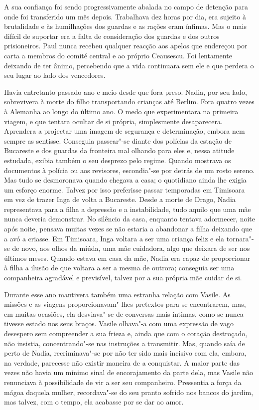 A sua confiança foi sendo progressivamente abalada no campo de detenção
para onde foi transferido um mês depois. Trabalhava dez horas por dia,
era sujeito à brutalidade e às humilhações dos guardas e as rações
eram ínfimas. Mas o mais difícil de suportar era a falta de consideração dos guardas e dos outros prisioneiros. Paul nunca recebeu
qualquer reacção aos apelos que endereçou por carta a membros do comité
central e ao próprio Ceausescu. Foi lentamente deixando de ter ânimo,
percebendo que a vida continuara sem ele e que perdera o seu lugar ao
lado dos vencedores.

Havia entretanto passado ano e meio desde que fora preso. Nadia, por seu
lado, sobrevivera à morte do filho transportando crianças até Berlim.
Fora quatro vezes à Alemanha ao longo do último ano. O medo que
experimentara na primeira viagem, e que tentara ocultar de si própria,
simplesmente desaparecera. Aprendera a projectar uma imagem de segurança
e determinação, embora nem sempre as sentisse. Conseguia passear"-se
diante dos polícias da
estação de Bucareste e dos guardas da fronteira mal olhando para eles e,
nessa atitude estudada, exibia também o seu desprezo pelo regime. Quando
mostrava os documentos à polícia ou aos revisores, escondia"-se por
detrás de um rosto sereno. Mas tudo se desmoronava quando chegava a
casa; o quotidiano ainda lhe exigia um esforço enorme. Talvez por isso
preferisse passar temporadas em Timisoara em vez de trazer Inga de volta
a Bucareste. Desde a morte de Drago, Nadia representava para a filha a
depressão e a instabilidade, tudo aquilo que uma mãe nunca deveria
demonstrar. No silêncio da casa, enquanto tentava adormecer, noite após
noite, pensava muitas vezes se não estaria a abandonar a filha deixando
que a avó a criasse. Em Timisoara, Inga voltara a ser uma criança feliz
e ela tornara"-se de novo, aos olhos da miúda, uma mãe cuidadora, algo
que deixara de ser nos últimos meses. Quando estava em casa da mãe,
Nadia era capaz de proporcionar à filha a ilusão de que voltara a ser a
mesma de outrora; conseguia ser uma companheira agradável e
previsível, talvez por a sua própria mãe cuidar de si.

Durante esse ano mantivera também uma estranha
relação com Vasile. As missões e as viagens proporcionavam"-lhes pretextos para se encontrarem, mas, em muitas ocasiões, ela
desviava"-se de conversas mais íntimas, como se nunca tivesse estado nos
seus braços. Vasile olhava"-a com uma expressão de vago desespero sem
compreender a sua frieza e, ainda que com o coração destroçado, não
insistia, concentrando"-se nas instruções a transmitir. Mas, quando saía
de perto de Nadia, recriminava"-se por não ter sido mais incisivo com
ela, embora, na verdade, parecesse não
existir maneira de a conquistar. A maior parte das vezes não havia um
mínimo sinal de encorajamento da parte dela, mas Vasile não renunciava à
possibilidade de vir a ser seu companheiro. Pressentia a força da mágoa
daquela mulher, recordava"-se do seu pranto sofrido nos bancos do jardim,
mas talvez, com o tempo, ela acabasse por se dar ao amor.

